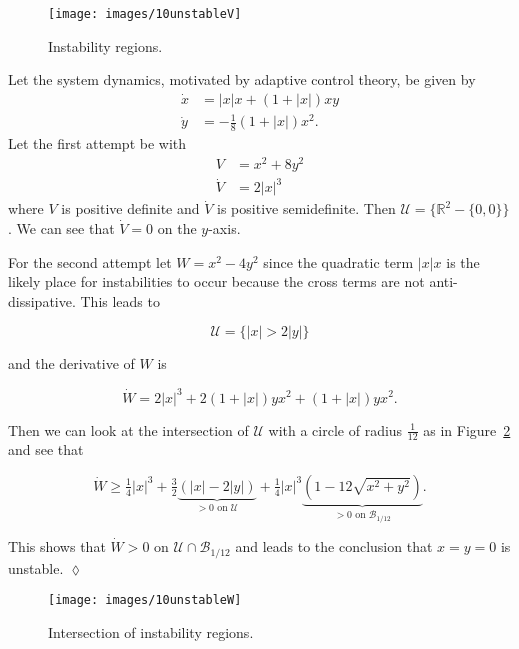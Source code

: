 \begin{figure}[ht!]
\centering
\texttt{[image: images/10unstableV]}
\caption{Instability regions.}%
\label{fig:10unstableV}
\end{figure}

\begin{example}
Let the system dynamics, motivated by adaptive control theory, be given by
\begin{align*}
\dot{x} &= |x|x + (1+|x|)xy \\
\dot{y} &= -\tfrac{1}{8}(1+|x|)x^2.
\end{align*}
Let the first attempt be with
\begin{align*}
V &= x^2 + 8y^2 \\
\dot{V} &= 2|x|^3
\end{align*}
where $V$ is positive definite and $\dot{V}$ is positive semidefinite.
Then $\mathcal{U} = \{\mathbb{R}^2 - \{0,0\}\}$.
We can see that $\dot{V} = 0$ on the $y$-axis.

For the second attempt let $W=x^2-4y^2$ since the quadratic term $|x|x$ is the likely place for instabilities to occur because the cross terms are not anti-dissipative.
This leads to

\begin{equation*}
\mathcal{U} = \{|x|>2|y|\}
\end{equation*}

and the derivative of $W$ is

\begin{equation*}
\dot{W} = 2|x|^3 + 2(1+|x|)yx^2 + (1+|x|)yx^2.
\end{equation*}

Then we can look at the intersection of $\mathcal{U}$ with a circle of radius $\tfrac{1}{12}$ as in Figure~\ref{fig:10unstableW} and see that

\begin{equation*}
\dot{W} \geq \tfrac{1}{4}|x|^3 + \tfrac{3}{2}\underbrace{(|x|-2|y|)}_{>0\text{\ on\ }\mathcal{U}} + \tfrac{1}{4}|x|^3
\underbrace{(1-12\sqrt{x^2+y^2})}_{>0\text{\ on\ }\mathcal{B}_{1/12}}.
\end{equation*}

This shows that $\dot{W}>0$ on $\mathcal{U}\cap\mathcal{B}_{1/12}$ and leads to the conclusion that $x=y=0$ is unstable.
$\lozenge$
\end{example}

\begin{figure}[ht!]
\centering
\texttt{[image: images/10unstableW]}
\caption{Intersection of instability regions.}%
\label{fig:10unstableW}
\end{figure}
